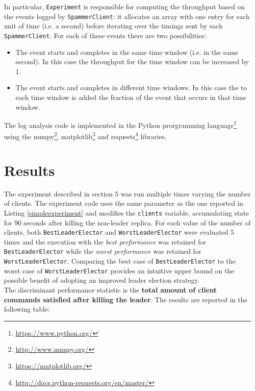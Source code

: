\documentclass[a4paper, 10pt]{article}
\begin{document}
In particular, \texttt{Experiment} is responsible for computing the throughput based on the events logged by \texttt{SpammerClient}: it allocates an array with one entry for each unit of time (i.e. a second) before iterating over the timings sent by each \texttt{SpammerClient}. For each of these events there are two possibilities:
\begin{itemize}
    \item The event starts and completes in the same time window (i.e. in the same second). In this case the throughput for the time window can be increased by 1.
    \item The event starts and completes in different time windows. In this case the to each time window is added the fraction of the event that occurs in that time window.
\end{itemize}

The log analysis code is implemented in the Python prorgramming language\footnote{\url{https://www.python.org/}} using the numpy\footnote{\url{http://www.numpy.org/}}, matplotlib\footnote{\url{https://matplotlib.org/}} and requests\footnote{\url{http://docs.python-requests.org/en/master/}} libraries.

\section{Results}
The experiment described in section 5 was run multiple times varying the number of clients. The experiment code uses the same parameter as the one reported in Listing \ref{simpleexperiment} and modifies the \texttt{clients} variable, accumulating state for $90$ seconds after killing the non-leader replica.
For each value of the number of clients, both \texttt{BestLeaderElector} and \texttt{WorstLeaderElector} were evaluated $5$ times and the execution with the \textit{best performance} was retained for \texttt{BestLeaderElector} while the \textit{worst performance} was retained for \texttt{WorstLeaderElector}.
Comparing the best case of \texttt{BestLeaderElector} to the worst case of \texttt{WorstLeaderElector} provides an intuitive upper bound on the possible benefit of adopting an improved leader election strategy.\\
The discriminant performance statistic is the \textbf{total amount of client commands satisfied after killing the leader}. The results are reported in the following table:
\end{document}
